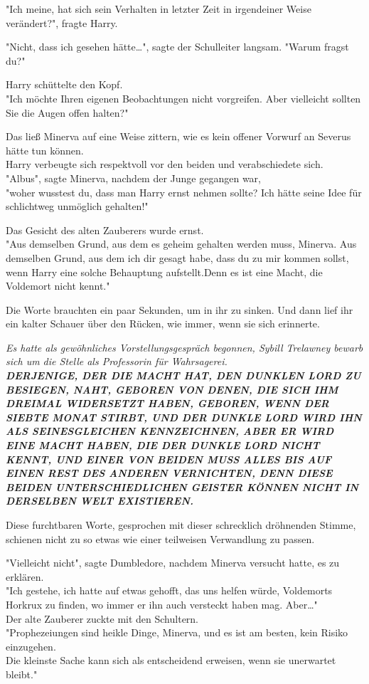 {"Ich meine, hat sich sein Verhalten in letzter Zeit in irgendeiner Weise verändert?", fragte Harry.

"Nicht, dass ich gesehen hätte…", sagte der Schulleiter langsam. "Warum fragst du?"

Harry schüttelte den Kopf.\\ "Ich möchte Ihren eigenen Beobachtungen nicht vorgreifen. Aber vielleicht sollten Sie die Augen offen halten?"

Das ließ Minerva auf eine Weise zittern, wie es kein offener Vorwurf an Severus hätte tun können.\\ Harry verbeugte sich respektvoll vor den beiden und verabschiedete sich.\\ "Albus", sagte Minerva, nachdem der Junge gegangen war,\\ "woher wusstest du, dass man Harry ernst nehmen sollte? Ich hätte seine Idee für schlichtweg unmöglich gehalten!"

Das Gesicht des alten Zauberers wurde ernst.\\ "Aus demselben Grund, aus dem es geheim gehalten werden muss, Minerva. Aus demselben Grund, aus dem ich dir gesagt habe, dass du zu mir kommen sollst, wenn Harry eine solche Behauptung aufstellt.Denn es ist eine Macht, die Voldemort nicht kennt."

Die Worte brauchten ein paar Sekunden, um in ihr zu sinken. Und dann lief ihr ein kalter Schauer über den Rücken, wie immer, wenn sie sich erinnerte.

\emph{Es hatte als gewöhnliches Vorstellungsgespräch begonnen, Sybill Trelawney bewarb sich um die Stelle als Professorin für Wahrsagerei.}\\ \emph{\hfill\break }\textbf{\emph{DERJENIGE, DER DIE MACHT HAT, DEN DUNKLEN LORD ZU BESIEGEN, NAHT, GEBOREN VON DENEN, DIE SICH IHM DREIMAL WIDERSETZT HABEN, GEBOREN, WENN DER SIEBTE MONAT STIRBT, UND DER DUNKLE LORD WIRD IHN ALS SEINESGLEICHEN KENNZEICHNEN, ABER ER WIRD EINE MACHT HABEN, DIE DER DUNKLE LORD NICHT KENNT, UND EINER VON BEIDEN MUSS ALLES BIS AUF EINEN REST DES ANDEREN VERNICHTEN, DENN DIESE BEIDEN UNTERSCHIEDLICHEN GEISTER KÖNNEN NICHT IN DERSELBEN WELT EXISTIEREN.}}

Diese furchtbaren Worte, gesprochen mit dieser schrecklich dröhnenden Stimme, schienen nicht zu so etwas wie einer teilweisen Verwandlung zu passen.

"Vielleicht nicht", sagte Dumbledore, nachdem Minerva versucht hatte, es zu erklären.\\ "Ich gestehe, ich hatte auf etwas gehofft, das uns helfen würde, Voldemorts Horkrux zu finden, wo immer er ihn auch versteckt haben mag. Aber…"\\ Der alte Zauberer zuckte mit den Schultern.\\ "Prophezeiungen sind heikle Dinge, Minerva, und es ist am besten, kein Risiko einzugehen.\\ Die kleinste Sache kann sich als entscheidend erweisen, wenn sie unerwartet bleibt."

}
